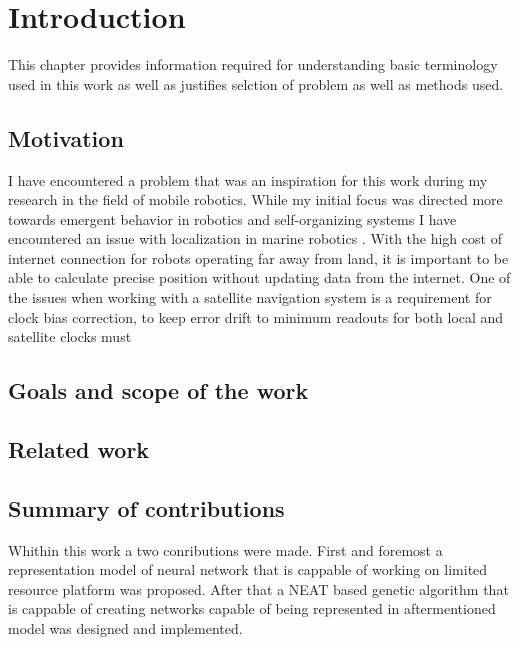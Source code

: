 \chapter{Introduction}
This chapter provides information required for understanding basic terminology used in this
work as well as justifies selction of problem as well as methods used.


\FloatBarrier
\section{Motivation}
I have encountered a problem that was an inspiration for this work during my research in the 
field of mobile robotics.
While my initial focus was directed more towards emergent behavior in robotics and self-organizing 
systems \cite{Gnys2017} \cite{Gnys2019} I have encountered an issue with localization in marine 
robotics \cite{Cabrera-Gamez2014}.
With the high cost of internet connection for robots operating far away from land, 
it is important to be able to calculate precise position without updating data from the internet.
One of the issues when working with a satellite navigation system is a requirement for clock bias
correction, to keep error drift to minimum readouts for both local and satellite clocks must

\FloatBarrier
\section{Goals and scope of the work}

\FloatBarrier
\section{Related work}


\FloatBarrier
\section{Summary of contributions}
Whithin this work a two conributions were made. First and foremost a representation model of
neural network that is cappable of working on limited resource platform was proposed.
After that a NEAT based genetic algorithm that is cappable of creating networks capable of being
represented in aftermentioned model was designed and implemented.

